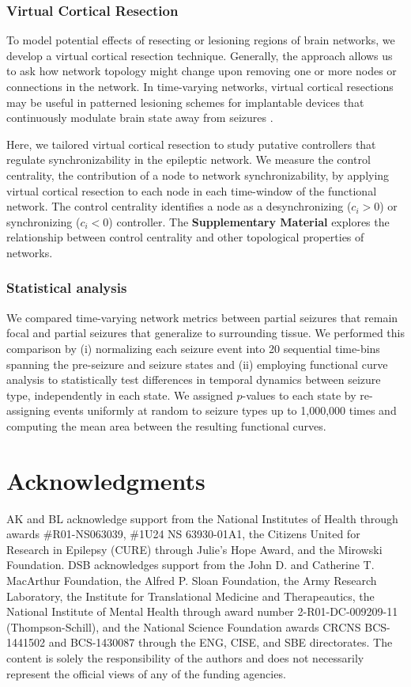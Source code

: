 \subsubsection{Virtual Cortical Resection}
To model potential effects of resecting or lesioning regions of brain networks, we develop a virtual cortical resection technique. Generally, the approach allows us to ask how network topology might change upon removing one or more nodes or connections in the network. In time-varying networks, virtual cortical resections may be useful in patterned lesioning schemes for implantable devices that continuously modulate brain state away from seizures \cite{stanslaski2012design, afshar2013translational}.

Here, we tailored virtual cortical resection to study putative controllers that regulate synchronizability in the epileptic network. We measure the control centrality, the contribution of a node to network synchronizability, by applying virtual cortical resection to each node in each time-window of the functional network. The control centrality identifies a node as a desynchronizing ($c_i > 0$) or synchronizing ($c_i < 0$) controller. The \textbf{Supplementary Material} explores the relationship between control centrality and other topological properties of networks.

\subsubsection{Statistical analysis}
We compared time-varying network metrics between partial seizures that remain focal and partial seizures that generalize to surrounding tissue. We performed this comparison by (i) normalizing each seizure event into 20 sequential time-bins spanning the pre-seizure and seizure states and (ii) employing functional curve analysis to statistically test differences in temporal dynamics between seizure type, independently in each state. We assigned $p$-values to each state by re-assigning events uniformly at random to seizure types up to 1,000,000 times and computing the mean area between the resulting functional curves.

\section{Acknowledgments}
AK and BL acknowledge support from the National Institutes of Health through awards \#R01-NS063039, \#1U24 NS 63930-01A1, the Citizens United for Research in Epilepsy (CURE) through Julie's Hope Award, and the Mirowski Foundation. DSB acknowledges support from the John D. and Catherine T. MacArthur Foundation, the Alfred P. Sloan Foundation, the Army Research Laboratory, the Institute for Translational Medicine and Therapeautics, the National Institute of Mental Health through award number 2-R01-DC-009209-11 (Thompson-Schill), and the National Science Foundation awards CRCNS BCS-1441502 and BCS-1430087 through the ENG, CISE, and SBE directorates. The content is solely the responsibility of the authors and does not necessarily represent the official views of any of the funding agencies.

